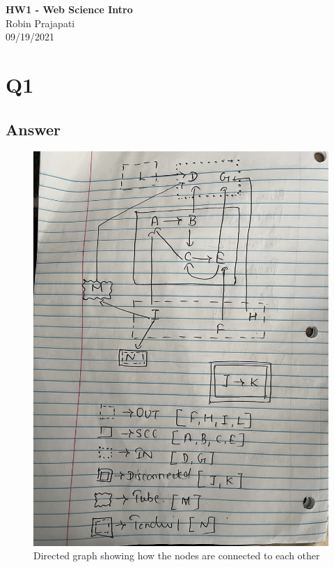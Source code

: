 \documentclass[12pt]{article}
\begin{document}
\begin{centering}
{\large\textbf{HW1 - Web Science Intro}}\\ 
Robin Prajapati\\
09/19/2021\\
\end{centering}


\section*{Q1}

\subsection*{Answer}



\begin{figure}[h]
    \centering
    \includegraphics[trim=0 0 0 0, clip, width=\textwidth] {Q1_1.jpg}
    \caption{ Directed graph showing how the nodes are connected to each other}
    \label{fig:web-growth}
\end{figure}
\end{document}
